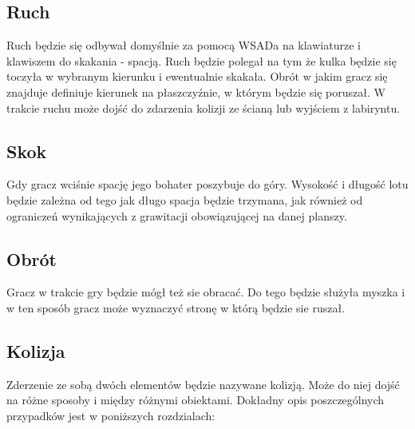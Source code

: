 \documentclass[12pt,a4paper,twoside]{article}
\begin{document}
\subsection{Ruch}
Ruch będzie się odbywał domyślnie za pomocą WSADa na klawiaturze i klawiszem do skakania - spacją. Ruch będzie polegał na tym że kulka będzie się toczyła w wybranym kierunku i ewentualnie skakała. Obrót w jakim gracz się znajduje definiuje kierunek na płaszczyźnie, w którym będzie się poruszał. W trakcie ruchu może dojść do zdarzenia kolizji ze ścianą lub wyjściem z labiryntu.

\subsection{Skok}
Gdy gracz wciśnie spację jego bohater poszybuje do góry. Wysokość i długość lotu będzie zależna od tego jak długo spacja będzie trzymana, jak również od ograniczeń wynikających z grawitacji obowiązującej na danej planszy.

\subsection{Obrót}
Gracz w trakcie gry będzie mógł też sie obracać. Do tego będzie służyła myszka i w ten sposób gracz może wyznaczyć stronę w którą będzie sie ruszał. 


\subsection{Kolizja}
Zderzenie ze sobą dwóch elementów będzie nazywane kolizją. Może do niej dojść na różne sposoby i między różnymi obiektami. Dokładny opis poszczególnych przypadków jest w poniższych rozdzialach:
\end{document}
